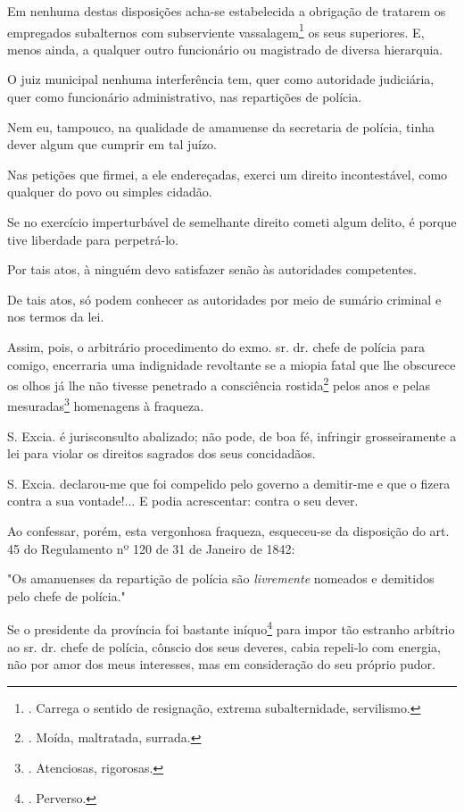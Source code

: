 Em nenhuma destas disposições acha-se estabelecida a obrigação de
tratarem os empregados subalternos com subserviente vassalagem\footnote{.
  Carrega o sentido de resignação, extrema subalternidade, servilismo.}
os seus superiores. E, menos ainda, a qualquer outro funcionário ou
magistrado de diversa hierarquia.

O juiz municipal nenhuma interferência tem, quer como autoridade
judiciária, quer como funcionário administrativo, nas repartições de
polícia.

Nem eu, tampouco, na qualidade de amanuense da secretaria de polícia,
tinha dever algum que cumprir em tal juízo.

Nas petições que firmei, a ele endereçadas, exerci um direito
incontestável, como qualquer do povo ou simples cidadão.

Se no exercício imperturbável de semelhante direito cometi algum delito,
é porque tive liberdade para perpetrá-lo.

Por tais atos, à ninguém devo satisfazer senão às autoridades
competentes.

De tais atos, só podem conhecer as autoridades por meio de sumário
criminal e nos termos da lei.

Assim, pois, o arbitrário procedimento do exmo. sr. dr. chefe de polícia
para comigo, encerraria uma indignidade revoltante se a miopia fatal que
lhe obscurece os olhos já lhe não tivesse penetrado a consciência
rostida\footnote{. Moída, maltratada, surrada.} pelos anos e pelas
mesuradas\footnote{. Atenciosas, rigorosas.} homenagens à fraqueza.

S. Excia. é jurisconsulto abalizado; não pode, de boa fé, infringir
grosseiramente a lei para violar os direitos sagrados dos seus
concidadãos.

S. Excia. declarou-me que foi compelido pelo governo a demitir-me e que
o fizera contra a sua vontade!... E podia acrescentar: contra o seu
dever.

Ao confessar, porém, esta vergonhosa fraqueza, esqueceu-se da disposição
do art. 45 do Regulamento nº 120 de 31 de Janeiro de 1842:

"Os amanuenses da repartição de polícia são \emph{livremente} nomeados e
demitidos pelo chefe de polícia."

Se o presidente da província foi bastante iníquo\footnote{. Perverso.}
para impor tão estranho arbítrio ao sr. dr. chefe de polícia, cônscio
dos seus deveres, cabia repeli-lo com energia, não por amor dos meus
interesses, mas em consideração do seu próprio pudor.

